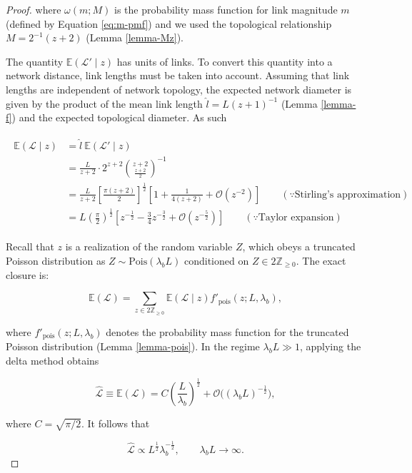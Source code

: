 \documentclass[11pt, class=article, crop=false]{standalone}
\theoremstyle{definition}
\begin{document}
\begin{proof}
where $\omega(m;M)$ is the probability mass function for link magnitude $m$ (defined by Equation \ref{eq:m-pmf}) and we used the topological relationship $M = 2^{-1}(z + 2)$ (Lemma \ref{lemma-Mz}).

The quantity $\mathbb{E}(\mathcal{L}'\mid z)$ has units of links.
To convert this quantity into a network distance, link lengths must be taken into account. 
Assuming that link lengths are independent of network topology, the expected network diameter is given by the product of the mean link length $\hat{l} = L(z+1)^{-1}$ (Lemma \ref{lemma-f}) and the expected topological diameter.
As such

\begin{align}
\begin{split} 
    \mathbb{E}(\mathcal{L} \mid z) 
    &= \hat{l}~\mathbb{E}(\mathcal{L}' \mid z)\\
    &= \frac{L}{z+2} \cdot 2^{z + 2} {\binom{z+2}{\frac{z + 2}{2}}}^{-1}\\
    &= \frac{L}{z+2} \left[\frac{\pi(z + 2)}{2}\right]^{\frac{1}{2}} \left[1 + \frac{1}{4 (z + 2)}  + \mathcal{O}(z^{-2})\right] \qquad (\because \text{Stirling's approximation})\\
    &= L \left(\frac{\pi}{2} \right)^{\frac{1}{2}} \left[z^{-\frac{1}{2}} - \frac{3}{4} z^{-\frac{3}{2}} + \mathcal{O}(z^{-\frac{5}{2}}) \right] \qquad (\because \text{Taylor expansion})
\end{split} 
\end{align}

Recall that $z$ is a realization of the random variable $Z$, which obeys a truncated Poisson distribution as $Z \sim \text{Pois}(\lambda_b L)$ conditioned on $Z \in 2\mathbb{Z}_{\ge0}$.
The exact closure is:

\begin{equation}
    \mathbb{E}(\mathcal{L})  = \sum_{z \in 2\mathbb{Z}_{\ge 0}} \mathbb{E}(\mathcal{L} \mid z) f'_{\text{pois}}(z; L, \lambda_b),
\end{equation}

where $f'_{\text{pois}}(z; L, \lambda_b)$ denotes the probability mass function for the truncated Poisson distribution (Lemma \ref{lemma-pois}).
In the regime $\lambda_b L \gg 1$, applying the delta method obtains

\begin{equation}
\hat{\mathcal{L}} 
\equiv 
\mathbb{E}(\mathcal{L}) 
= 
C \left(\frac{L}{\lambda_b} \right)^{\frac{1}{2}} + \mathcal{O}\bigl((\lambda_b L)^{-\frac{1}{2}}\bigr),
\end{equation}

where $C = \sqrt{\pi / 2}$.
It follows that

\begin{equation}
    \hat{\mathcal{L}}
    \propto
    L^{\frac{1}{2}}\lambda_b^{-\frac{1}{2}},
    \qquad
    \lambda_b L \to \infty.
\end{equation}
    
\end{proof}
\end{document}
